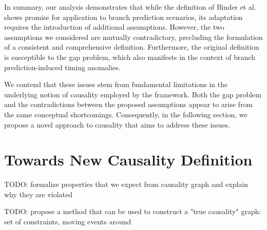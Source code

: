 In summary, our analysis demonstrates that while the definition of Binder et al. shows promise for application to branch prediction scenarios, its adaptation requires the introduction of additional assumptions. However, the two assumptions we considered are mutually contradictory, precluding the formulation of a consistent and comprehensive definition. Furthermore, the original definition is susceptible to the gap problem, which also manifests in the context of branch prediction-induced timing anomalies.

We contend that these issues stem from fundamental limitations in the underlying notion of causality employed by the framework. Both the gap problem and the contradictions between the proposed assumptions appear to arise from the same conceptual shortcomings. Consequently, in the following section, we propose a novel approach to causality that aims to address these issues.

\section{Towards New Causality Definition}

TODO: formalize properties that we expect from causality graph and explain why they are violated

TODO: propose a method that can be used to construct a "true causality" graph: set of constraints, moving events around